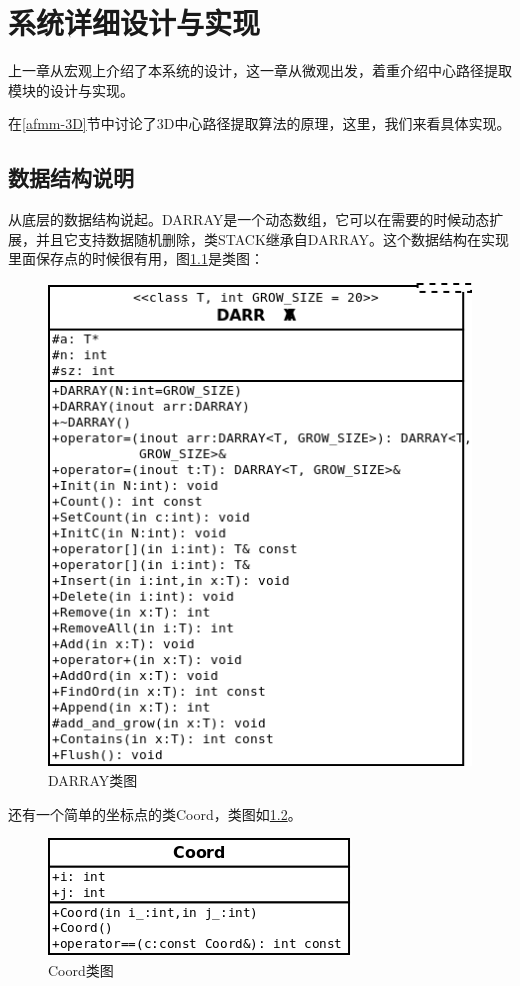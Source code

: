 \chapter{系统详细设计与实现}

上一章从宏观上介绍了本系统的设计，这一章从微观出发，着重介绍中心路径提取模块的设计与实现。

在\ref{afmm-3D}节中讨论了3D中心路径提取算法的原理，这里，我们来看具体实现。
\section{数据结构说明}

从底层的数据结构说起。DARRAY是一个动态数组，它可以在需要的时候动态扩展，并且它支持数据随机删除，类STACK继承自DARRAY。这个数据结构在实现里面保存点的时候很有用，图\ref{darray_class}是类图：
\begin{figure}[h!]
    \centering
    \includegraphics[width=300bp]{figure/darray.png}
    \caption{DARRAY类图}
    \label{darray_class}
\end{figure}

还有一个简单的坐标点的类Coord，类图如\ref{coord-class}。
\begin{figure}[h!]
    \centering
    \includegraphics[width=214bp]{figure/coord.png}
    \caption{Coord类图}
    \label{coord-class}
\end{figure}

